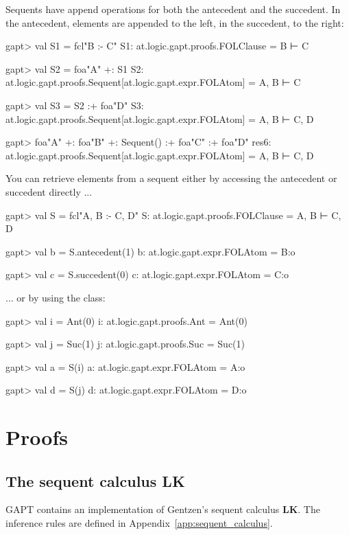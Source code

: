 \documentclass[a4paper,11pt]{book}
\newcommand{\LK}{\textbf{LK}}
\newcommand{\cli}[1]{{\ttfamily {#1}}}
\begin{document}
Sequents have append operations for both the antecedent and the succedent. In the antecedent,
elements are appended to the left, in the succedent, to the right:

\begin{clilisting}
gapt> val S1 = fcl"B :- C"
S1: at.logic.gapt.proofs.FOLClause = B ⊢ C

gapt> val S2 = foa"A" +: S1
S2: at.logic.gapt.proofs.Sequent[at.logic.gapt.expr.FOLAtom] = A, B ⊢ C

gapt> val S3 = S2 :+ foa"D"
S3: at.logic.gapt.proofs.Sequent[at.logic.gapt.expr.FOLAtom] = A, B ⊢ C, D

gapt> foa"A" +: foa"B" +: Sequent() :+ foa"C" :+ foa"D"
res6: at.logic.gapt.proofs.Sequent[at.logic.gapt.expr.FOLAtom] = A, B ⊢ C, D

\end{clilisting}

You can retrieve elements from a sequent either by accessing the antecedent
or succedent directly ...
\begin{clilisting}
gapt> val S = fcl"A, B :- C, D"
S: at.logic.gapt.proofs.FOLClause = A, B ⊢ C, D

gapt> val b = S.antecedent(1)
b: at.logic.gapt.expr.FOLAtom = B:o

gapt> val c = S.succedent(0)
c: at.logic.gapt.expr.FOLAtom = C:o

\end{clilisting}
... or by using the \cli{SequentIndex} class:

\begin{clilisting}
gapt> val i = Ant(0)
i: at.logic.gapt.proofs.Ant = Ant(0)

gapt> val j = Suc(1)
j: at.logic.gapt.proofs.Suc = Suc(1)

gapt> val a = S(i)
a: at.logic.gapt.expr.FOLAtom = A:o

gapt> val d = S(j)
d: at.logic.gapt.expr.FOLAtom = D:o

\end{clilisting}


\section{Proofs}\label{sec:entering_proofs}

\subsection{The sequent calculus LK}
GAPT contains an implementation of Gentzen's sequent calculus {\LK}.
The inference rules are defined in Appendix~\ref{app:sequent_calculus}.
\end{document}
